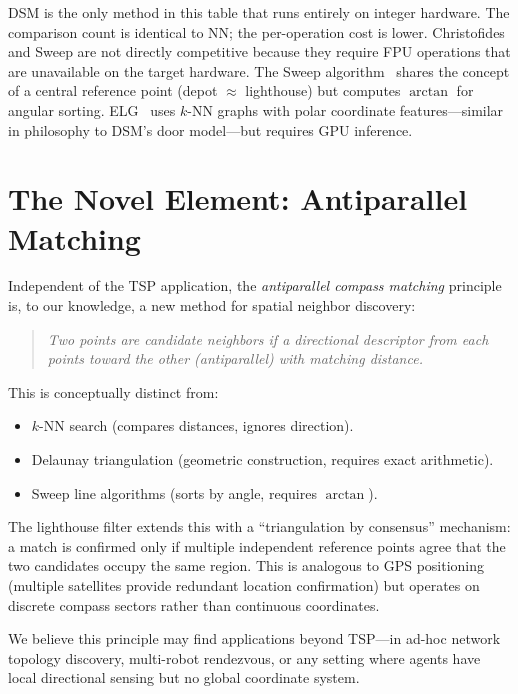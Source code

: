 \documentclass[11pt,a4paper,twocolumn]{article}
\begin{document}
DSM is the only method in this table that runs entirely on integer hardware. The comparison count is identical to NN; the per-operation cost is lower. Christofides and Sweep are not directly competitive because they require FPU operations that are unavailable on the target hardware. The Sweep algorithm~\cite{gillett1974} shares the concept of a central reference point (depot $\approx$ lighthouse) but computes $\arctan$ for angular sorting. ELG~\cite{gao2023} uses $k$-NN graphs with polar coordinate features---similar in philosophy to DSM's door model---but requires GPU inference.

\FloatBarrier
\section{The Novel Element: Antiparallel Matching}\label{sec:novel}

Independent of the TSP application, the \textit{antiparallel compass matching} principle is, to our knowledge, a new method for spatial neighbor discovery:

\begin{quote}
\textit{Two points are candidate neighbors if a directional descriptor from each points toward the other (antiparallel) with matching distance.}
\end{quote}

This is conceptually distinct from:
\begin{itemize}[leftmargin=*,itemsep=1pt]
\item $k$-NN search (compares distances, ignores direction).
\item Delaunay triangulation (geometric construction, requires exact arithmetic).
\item Sweep line algorithms (sorts by angle, requires $\arctan$).
\end{itemize}

The lighthouse filter extends this with a ``triangulation by consensus'' mechanism: a match is confirmed only if multiple independent reference points agree that the two candidates occupy the same region. This is analogous to GPS positioning (multiple satellites provide redundant location confirmation) but operates on discrete compass sectors rather than continuous coordinates.

We believe this principle may find applications beyond TSP---in ad-hoc network topology discovery, multi-robot rendezvous, or any setting where agents have local directional sensing but no global coordinate system.
\end{document}
